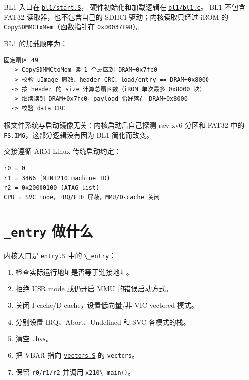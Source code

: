 BL1 入口在
\href{../../../kernel/arch/arm/mach-s5pv210/bl1/start.S}{\passthrough{\lstinline!bl1/start.S!}}，
硬件初始化和加载逻辑在
\href{../../../kernel/arch/arm/mach-s5pv210/bl1/bl1.c}{\passthrough{\lstinline!bl1/bl1.c!}}。
BL1 不包含 FAT32 读取器，也不包含自己的 SDHCI 驱动；内核读取只经过
iROM 的 \passthrough{\lstinline!CopySDMMCtoMem!}（函数指针在
\passthrough{\lstinline!0xD0037F98!}）。

BL1 的加载顺序为：

\begin{lstlisting}
固定扇区 49
  -> CopySDMMCtoMem 读 1 个扇区到 DRAM+0x7fc0
  -> 校验 uImage 魔数、header CRC、load/entry == DRAM+0x8000
  -> 按 header 的 size 计算总扇区数（iROM 单次最多 0x8000 块）
  -> 继续读到 DRAM+0x7fc0，payload 恰好落在 DRAM+0x8000
  -> 校验 data CRC
\end{lstlisting}

根文件系统与启动镜像无关：内核启动后自己探测 raw xv6 分区和 FAT32 中的
\passthrough{\lstinline!FS.IMG!}，这部分逻辑没有因为 BL1 简化而改变。

交接遵循 ARM Linux 传统启动约定：

\begin{lstlisting}
r0 = 0
r1 = 3466 (MINI210 machine ID)
r2 = 0x20000100 (ATAG list)
CPU = SVC mode，IRQ/FIQ 屏蔽，MMU/D-cache 关闭
\end{lstlisting}

\section{\texorpdfstring{\texttt{\_entry}
做什么}{\_entry 做什么}}\label{_entry-ux505aux4ec0ux4e48}

内核入口是
\href{../../../kernel/arch/arm/mach-s5pv210/entry.S}{\passthrough{\lstinline!entry.S!}}
中的 \passthrough{\lstinline!\_entry!}：

\begin{enumerate}
\def\labelenumi{\arabic{enumi}.}
\tightlist
\item
  检查实际运行地址是否等于链接地址。
\item
  拒绝 USR mode 或仍开启 MMU 的错误启动方式。
\item
  关闭 I-cache/D-cache，设置低向量/非 VIC vectored 模式。
\item
  分别设置 IRQ、Abort、Undefined 和 SVC 各模式的栈。
\item
  清空 \passthrough{\lstinline!.bss!}。
\item
  把 VBAR 指向
  \href{../../../kernel/arch/arm/vectors.S}{\passthrough{\lstinline!vectors.S!}}
  的 \passthrough{\lstinline!vectors!}。
\item
  保留 \passthrough{\lstinline!r0/r1/r2!} 并调用
  \passthrough{\lstinline!x210\_main()!}。
\end{enumerate}

